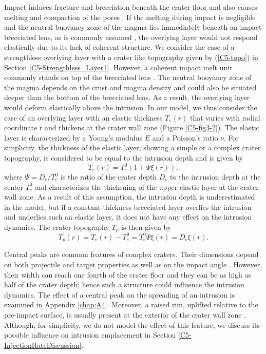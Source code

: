 Impact  induces  fracture and  brecciation  beneath  the crater  floor
\citep{Wilhelms:1987vb,Melosh:1989jl,Jolliff:2000vf}  and also  causes
melting        and        compaction        of        the        pores
\citep{Melosh:1989jl,Schultz:1976kt}.  If the melting during impact is
negligible and the neutral buoyancy zone of the magma lies immediately
beneath   an  impact   brecciated   lens,  as   is  commonly   assumed
\citep{Schultz:1976kt,Wichman:1996bj,Jozwiak:2012dq},   the  overlying
layer  would not  respond  elastically  due to  its  lack of  coherent
structure. We consider the case of a strengthless overlying layer with
a  crater   like  topography  given  by   (\ref{C5-topo})  in  Section
\ref{C5-Strengthless_Layer1}.   However, a  coherent impact  melt unit
commonly     stands    on     top    of     the    brecciated     lens
\citep{Melosh:1989jl,Schultz:1976kt}.   The neutral  buoyancy zone  of
the magma  depends on the  crust and magma  density and could  also be
situated deeper than the bottom of  the brecciated lens.  As a result,
the overlying layer would deform  elastically above the intrusion.  In
our model,  we thus consider  the case of  an overlying layer  with an
elastic thickness  $T_e(r)$ that varies  with radial coordinate  r and
thickens  at  the  crater  wall zone  (Figure  \ref{C5-fig3-2}).   The
elastic  layer  is  characterized  by  a Young's  modulus  $E$  and  a
Poisson's ratio $\nu$.   For simplicity, the thickness  of the elastic
layer, showing a simple or  a complex crater topography, is considered
to be equal to the intrusion depth and is given by
\begin{equation}
  T_e(r)=T_{e}^0(1+\Psi \xi(r)),
  \label{C5-3-2}
\end{equation}	
where $\Psi=D_{c}/T_{e}^0$ is the ratio of the crater depth $D_{c}$ to
the  intrusion depth  at the  center $T_{e}^0$  and characterizes  the
thickening of the  upper elastic layer at the crater  wall zone.  As a
result of  this assumption, the  intrusion depth is  underestimated in
the model, but  if a constant thickness brecciated  layer overlies the
intrusion and  underlies such an elastic  layer, it does not  have any
effect on the intrusion dynamics.  The crater topography $T_p$ is then
given by
\begin{equation}
  T_p(r)=T_e(r)-T_e^0=T_e^0\Psi\xi(r)=D_c\xi(r).
  \label{C5-topo1}
\end{equation}
	 
Central  peaks   are  common  features  of   complex  craters.   Their
dimensions depend on both projectile  and target properties as well as
on  the  impact  angle  \citep{Schultz:1994cv,Bray:2008fu}.   However,
their width can reach  one fourth of the crater floor  and they can be
as high  as half  of the  crater depth; hence  such a  structure could
influence the intrusion dynamics.  The effect of a central peak on the
spreading  of  an intrusion  is  examined  in Appendix  \ref{chap:A4}.
Moreover, a raised  rim, uplifted relative to  the pre-impact surface,
is  usually  present   at  the  exterior  of  the   crater  wall  zone
\citep{Pike:1976ei,Pike:1980eh}. Although,  for simplicity, we  do not
model the effect of this feature, we discuss its possible influence on
intrusion emplacement in Section \ref{C5-InjectionRateDiscussion}.
	 		 
